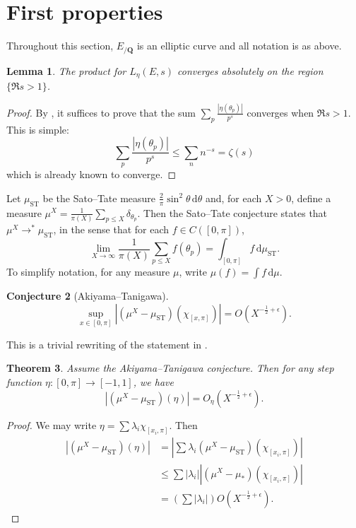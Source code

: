 \documentclass{article}
\newcommand{\bQ}{\mathbf{Q}}
\newcommand{\dd}{\mathrm{d}}
\newcommand{\ST}{\mathrm{ST}}
\newtheorem{theorem}{Theorem}
\newtheorem{conjecture}[theorem]{Conjecture}
\newtheorem{lemma}[theorem]{Lemma}
\numberwithin{theorem}{section}
\begin{document}
\section{First properties}

Throughout this section, $E_{/\bQ}$ is an elliptic curve and all notation is as 
above. 

\begin{lemma}
The product for $L_\eta(E,s)$ converges absolutely on the region 
$\{\Re s>1\}$. 
\end{lemma}
\begin{proof}
By \cite[\S3.7, Th.~5]{knopp-1956}, it suffices to prove that the sum 
$\sum_p \frac{|\eta(\theta_p)|}{p^s}$ converges when $\Re s>1$. This is 
simple: 
\[
	\sum_p \frac{|\eta(\theta_p)|}{p^s} \leqslant \sum_n n^{-s} = \zeta(s)
\]
which is already known to converge. 
\end{proof}

Let $\mu_\ST$ be the Sato--Tate measure 
$\frac{2}{\pi}\sin^2\theta\, \dd \theta$ and, for each $X>0$, define a measure 
$\mu^X=\frac{1}{\pi(X)}\sum_{p\leqslant X} \delta_{\theta_p}$. Then the 
Sato--Tate conjecture states that $\mu^X\to^\ast \mu_\ST$, in the sense that 
for each $f\in C([0,\pi])$, 
\[
	\lim_{X\to \infty} \frac{1}{\pi(X)} \sum_{p\leqslant X} f(\theta_p) = \int_{[0,\pi]} f\, \dd \mu_\ST .
\]
To simplify notation, for any measure $\mu$, write $\mu(f)=\int f\, \dd \mu$. 

\begin{conjecture}[Akiyama--Tanigawa]
\[
	\sup_{x\in [0,\pi]} \left| (\mu^X - \mu_\ST)(\chi_{[x,\pi]})\right| = O(X^{-\frac 1 2+\epsilon}) .
\]
\end{conjecture}
This is a trivial rewriting of the statement in 
\cite[Conj.~1]{akiyama-tanigawa}. 

\begin{theorem}
Assume the Akiyama--Tanigawa conjecture. Then for any step function 
$\eta\colon [0,\pi] \to [-1,1]$, we have 
\[
	\left| (\mu^X-\mu_\ST)(\eta)\right| = O_\eta(X^{-\frac 1 2+\epsilon}) .
\]
\end{theorem}
\begin{proof}
We may write $\eta = \sum \lambda_i \chi_{[x_i,\pi]}$. Then 
\begin{align*}
	\left| (\mu^X-\mu_\ST)(\eta)\right|
		&= \left| \sum \lambda_i (\mu^X-\mu_\ST)(\chi_{[x_i,\pi]}) \right| \\
		&\leqslant \sum |\lambda_i| \left| (\mu^X-\mu_\ast)(\chi_{[x_i,\pi]})\right| \\
		&= \left(\sum |\lambda_i|\right) O(X^{-\frac 1 2+\epsilon}) .
\end{align*}
\end{proof}
\end{document}
